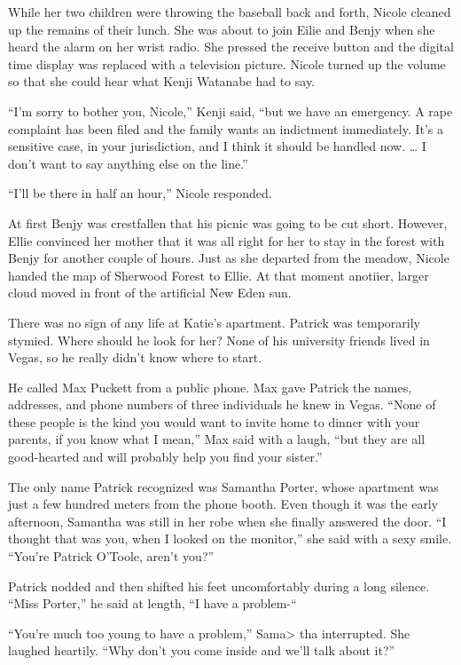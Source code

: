 \documentclass[]{article}
\begin{document}
{While her two children were throwing the baseball back and forth, Nicole cleaned up the remains of their lunch. She was about to join Eilie and Benjy when she heard the alarm on her wrist radio. She pressed the receive button and the digital time display was replaced with a television picture. Nicole turned up the volume so that she could hear what Kenji Watanabe had to say.

“I’m sorry to bother you, Nicole,” Kenji said, “but we have an emergency. A rape complaint has been filed and the family wants an indictment immediately. It’s a sensitive case, in your jurisdiction, and I think it should be handled now. … I don’t want to say anything else on the line.”

“I’ll be there in half an hour,” Nicole responded.

At first Benjy was crestfallen that his picnic was going to be cut short. However, Ellie convinced her mother that it was all right for her to stay in the forest with Benjy for another couple of hours. Just as she departed from the meadow, Nicole handed the map of Sherwood Forest to Ellie. At that moment anotiier, larger cloud moved in front of the artificial New Eden sun.

There was no sign of any life at Katie’s apartment. Patrick was temporarily stymied. Where should he look for her? None of his university friends lived in Vegas, so he really didn’t know where to start.

He called Max Puckett from a public phone. Max gave Patrick the names, addresses, and phone numbers of three individuals he knew in Vegas. “None of these people is the kind you would want to invite home to dinner with your parents, if you know what I mean,” Max said with a laugh, “but they are all good-hearted and will probably help you find your sister.”

The only name Patrick recognized was Samantha Porter, whose apartment was just a few hundred meters from the phone booth. Even though it was the early afternoon, Samantha was still in her robe when she finally answered the door. “I thought that was you, when I looked on the monitor,” she said with a sexy smile. “You’re Patrick O’Toole, aren’t you?”

Patrick nodded and then shifted his feet uncomfortably during a long silence. “Miss Porter,” he said at length, “I have a problem-“

“You’re much too young to have a problem,” Sama> tha interrupted. She laughed heartily. “Why don’t you come inside and we’ll talk about it?”

}
\end{document}

